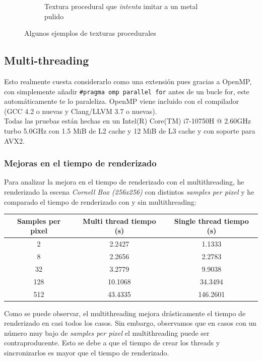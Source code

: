 \documentclass{article}
\begin{document}
\begin{figure}[H]
\begin{subfigure}[h]{0.4\linewidth}
    \caption{Textura procedural que \textit{intenta} imitar a un metal pulido}
  \end{subfigure}
  \caption{Algunos ejemplos de texturas procedurales}
\end{figure}

\subsection{Multi-threading}
Esto realmente cuesta considerarlo como una extensión pues gracias a OpenMP, con
simplemente añadir \texttt{\#pragma omp parallel for} antes de un bucle for,
este automáticamente te lo paraleliza. OpenMP viene incluido con el compilador
(GCC 4.2 o nuevas y Clang/LLVM 3.7 o nuevas). \\

Todas las pruebas están hechas en un Intel(R) Core(TM) i7-10750H @ 2.60GHz turbo
5.0GHz con 1.5 MiB de L2 cache y 12 MiB de L3 cache y con soporte para AVX2.

\subsubsection{Mejoras en el tiempo de renderizado}

Para analizar la mejora en el tiempo de renderizado con el multithreading, he
renderizado la escena \textit{Cornell Box (256x256)} con distintos \textit{samples per
  pixel} y he comparado el tiempo de renderizado con y sin multithreading:

\begin{center}
\begin{tabular}{||c c c||}
 \hline
 Samples per pixel & Multi thread tiempo (s) & Single thread tiempo (s) \\ [0.5ex]
 \hline\hline
 2 & 2.2427 & 1.1333 \\
 \hline
 8 & 2.2656 & 2.2783 \\
 \hline
 32 & 3.2779 & 9.9038 \\
 \hline
 128 & 10.1068 & 34.3494 \\
 \hline
 512 & 43.4335 & 146.2601 \\ [1ex]
 \hline
\end{tabular}
\end{center}

Como se puede observar, el multithreading mejora drásticamente el tiempo de
renderizado en casi todos los casos. Sin embargo, observamos que en casos con un
número muy bajo de \textit{samples per pixel} el multithreading puede ser
contraproducente. Esto se debe a que el tiempo de crear los threads y
sincronizarlos es mayor que el tiempo de renderizado.
\end{document}
